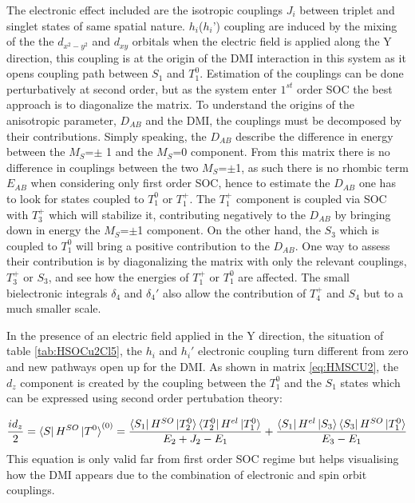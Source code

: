 \documentclass[10pt]{report}
\numberwithin{equation}{section}
\begin{document}
The electronic effect included are the isotropic couplings $J_i$ between triplet and singlet states of same spatial nature. 
$h_i$($h_i$') coupling are induced by the mixing of the the $d_{x^2-y^2}$ and $d_{xy}$ orbitals when the electric field is applied along the Y direction, this coupling is at the origin of the DMI interaction in this system as it opens coupling path between $S_1$ and $T_1^0$.
Estimation of the couplings can be done perturbatively at second order, but as the system enter $1^{st}$ order SOC the best approach is to diagonalize the matrix.
To understand the origins of the anisotropic parameter, $D_{AB}$ and the DMI, the couplings must be decomposed by their contributions.
Simply speaking, the $D_{AB}$ describe the difference in energy between the $M_S$=$\pm$ 1 and the $M_S$=0 component.
From this matrix there is no difference in couplings between the two $M_S$=$\pm$1, as such there is no rhombic term $E_{AB}$ when considering only first order SOC, hence to estimate the $D_{AB}$ one has to look for states coupled to $T_1^0$ or $T_1^+$.
The $T_1^+$ component is coupled via SOC with $T_3^+$ which will stabilize it, contributing negatively to the $D_{AB}$ by bringing down in energy the $M_S$=$\pm$1 component.
On the other hand, the $S_3$ which is coupled to $T_1^0$ will bring a positive contribution to the $D_{AB}$. 
One way to assess their contribution is by diagonalizing the matrix with only the relevant couplings, $T_3^+$ or $S_3$, and see how the energies of $T_1^+$ or $T_1^0$ are affected.
The small bielectronic integrals $\delta_4$ and $\delta_4'$ also allow the contribution of $T_4^+$ and $S_4$ but to a much smaller scale.

In the presence of an electric field applied in the Y direction, the situation of table \ref{tab:HSOCu2Cl5}, the $h_i$ and $h_i'$ electronic coupling turn different from zero and new pathways open up for the DMI.
As shown in matrix \ref{eq:HMSCU2}, the $d_z$ component is created by the coupling between the $T_1^0$ and the $S_1$ states which can be expressed using second order pertubation theory:

\begin{equation}
    \frac{id_z}{2}=\bra{S}H^{SO}\ket{T^0}^{(0)}=\frac{\bra{S_1}H^{SO}\ket{T_2^0}\bra{T_2^0}H^{el}\ket{T_1^0}}{E_2+J_2-E_1}+\frac{\bra{S_1}H^{el}\ket{S_3}\bra{S_3}H^{SO}\ket{T_1^0}}{E_3-E_1}
\end{equation}
This equation is only valid far from first order SOC regime but helps visualising how the DMI appears due to the combination of electronic and spin orbit couplings.
\end{document}
